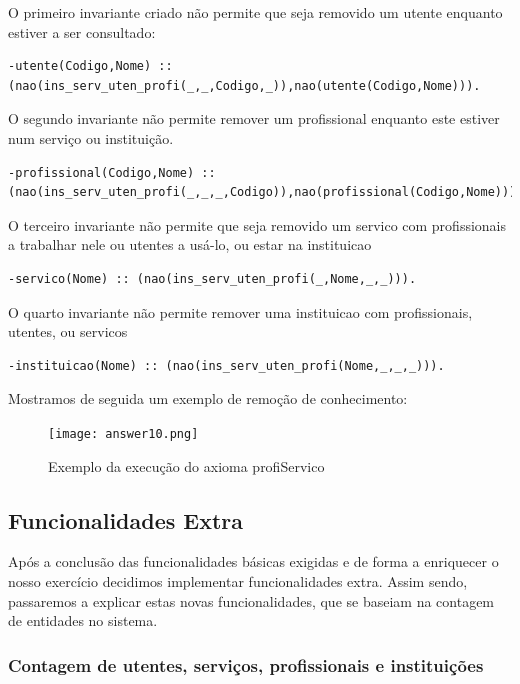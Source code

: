 O primeiro invariante criado não permite que seja removido um utente enquanto estiver a ser consultado: 

\begin{Verbatim}
-utente(Codigo,Nome) :: (nao(ins_serv_uten_profi(_,_,Codigo,_)),nao(utente(Codigo,Nome))).
\end{Verbatim}

O segundo invariante não permite remover um profissional enquanto este estiver num serviço ou instituição. 

\begin{Verbatim}
-profissional(Codigo,Nome) :: (nao(ins_serv_uten_profi(_,_,_,Codigo)),nao(profissional(Codigo,Nome))).
\end{Verbatim}

O terceiro invariante não permite  que seja removido um servico com profissionais a trabalhar nele ou utentes a usá-lo, ou estar na instituicao

\begin{Verbatim}
-servico(Nome) :: (nao(ins_serv_uten_profi(_,Nome,_,_))).
\end{Verbatim}

O quarto invariante não permite remover uma instituicao com profissionais, utentes, ou servicos
\begin{Verbatim}
-instituicao(Nome) :: (nao(ins_serv_uten_profi(Nome,_,_,_))).
\end{Verbatim}

Mostramos de seguida um exemplo de remoção de conhecimento: 

\begin{figure}[<+htpb+>]
	\centering
	\texttt{[image: answer10.png]}
	\caption{Exemplo da execução do axioma profiServico}
	\label{p3:fig:output10}
\end{figure}

\newpage

\subsection{Funcionalidades Extra}

Após a conclusão das funcionalidades básicas exigidas e de forma a enriquecer o nosso exercício decidimos implementar funcionalidades extra. 
Assim sendo, passaremos a explicar estas novas funcionalidades, que se baseiam na contagem de entidades no sistema. 

\subsubsection{Contagem de utentes, serviços, profissionais e instituições}

